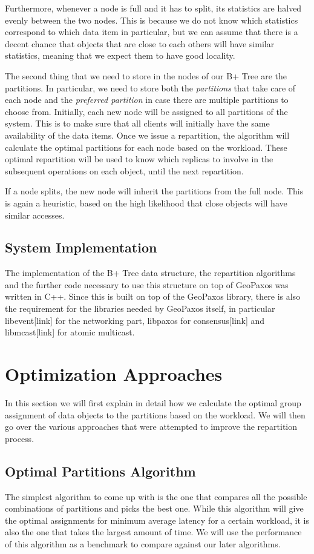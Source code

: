 Furthermore, whenever a node is full and it has to split, its statistics are halved evenly between the two nodes. This is because we do not know which statistics correspond to which data item in particular, but we can assume that there is a decent chance that objects that are close to each others will have similar statistics, meaning that we expect them to have good locality.

The second thing that we need to store in the nodes of our B+ Tree are the partitions. In particular, we need to store both the \emph{partitions} that take care of each node and the \emph{preferred partition} in case there are multiple partitions to choose from. Initially, each new node will be assigned to all partitions of the system. This is to make sure that all clients will initially have the same availability of the data items. Once we issue a repartition, the algorithm will calculate the optimal partitions for each node based on the workload. These optimal repartition will be used to know which replicas to involve in the subsequent operations on each object, until the next repartition.

If a node splits, the new node will inherit the partitions from the full node. This is again a heuristic, based on the high likelihood that close objects will have similar accesses.

\subsection{System Implementation}\label{sec:system-implementation}
The implementation of the B+ Tree data structure, the repartition algorithms and the further code necessary to use this structure on top of GeoPaxos was written in C++. Since this is built on top of the GeoPaxos library, there is also the requirement for the libraries needed by GeoPaxos itself, in particular libevent[link] for the networking part, libpaxos for consensus[link] and libmcast[link] for atomic multicast.

\section{Optimization Approaches}\label{sec:optimization-approaches}
In this section we will first explain in detail how we calculate the optimal group assignment of data objects to the partitions based on the workload. We will then go over the various approaches that were attempted to improve the repartition process. 

\subsection{Optimal Partitions Algorithm}\label{sec:optimal-partitions-algorithm} 
The simplest algorithm to come up with is the one that compares all the possible combinations of partitions and picks the best one. While this algorithm will give the optimal assignments for minimum average latency for a certain workload, it is also the one that takes the largest amount of time. We will use the performance of this algorithm as a benchmark to compare against our later algorithms.

